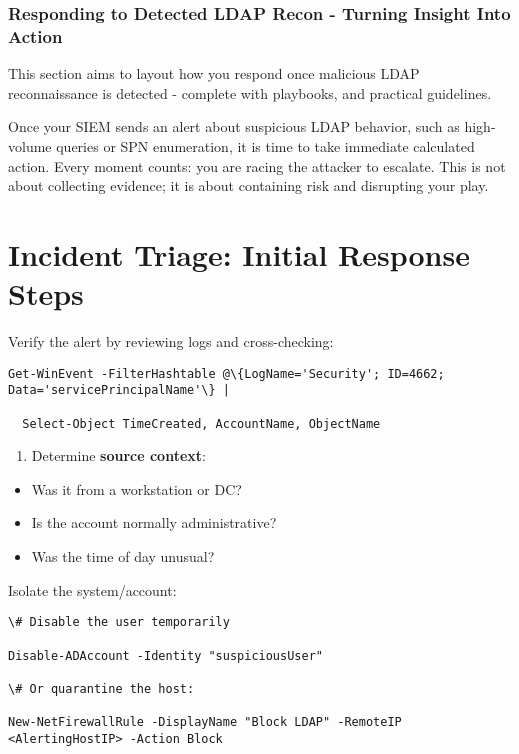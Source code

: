 {{\subsubsection{Responding to Detected LDAP Recon - Turning Insight Into Action}

This section aims to layout how you respond once malicious LDAP reconnaissance is detected - complete with playbooks, and practical guidelines.

Once your SIEM sends an alert about suspicious LDAP behavior, such as high-volume  queries or SPN enumeration, it is time to take immediate calculated action. Every moment counts: you are racing the attacker to escalate. This is not about collecting evidence; it is about containing risk and disrupting your play.

\section{Incident Triage: Initial Response Steps}

Verify the alert by reviewing logs and cross-checking:
\begin{verbatim}
Get-WinEvent -FilterHashtable @\{LogName='Security'; ID=4662; Data='servicePrincipalName'\} |

  Select-Object TimeCreated, AccountName, ObjectName
\end{verbatim}

\begin{enumerate}
    \item Determine \textbf{source context}:
\end{enumerate}

\begin{itemize}
     \item Was it from a workstation or DC?
     \item Is the account normally administrative?
     \item Was the time of day unusual?
    \end{itemize}

Isolate the system/account:
\begin{verbatim}
\# Disable the user temporarily

Disable-ADAccount -Identity "suspiciousUser"

\# Or quarantine the host:

New-NetFirewallRule -DisplayName "Block LDAP" -RemoteIP <AlertingHostIP> -Action Block
\end{verbatim}

}}
